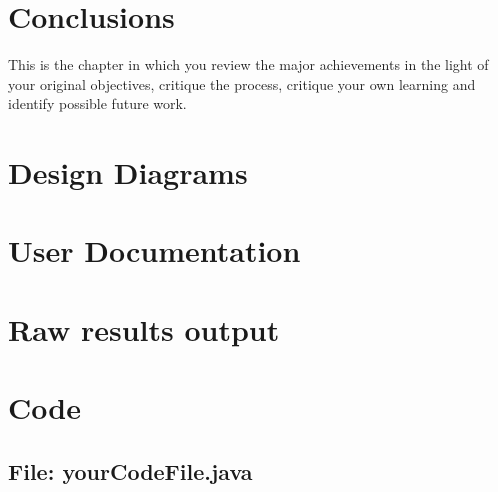 \documentclass[11pt,openright,a4paper]{report}
\begin{document}
\chapter{Conclusions}
%

This is the chapter in which you review the major achievements in the
light of your original objectives, critique the process, critique your
own learning and identify possible future work.





\appendix


\chapter{Design Diagrams}

\chapter{User Documentation}

\chapter{Raw results output}

\chapter{Code}


\begin{landscape}
\begin{multicols}{2}
\section{File: yourCodeFile.java}

\end{multicols}
\end{landscape}
\end{document}
